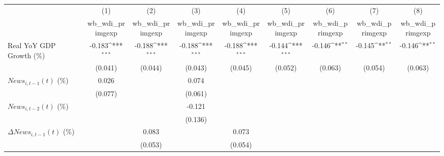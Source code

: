 {
\def\sym#1{\ifmmode^{#1}\else\(^{#1}\)\fi}
\begin{tabular}{l*{8}{c}}
\toprule
                    &\multicolumn{1}{c}{(1)}&\multicolumn{1}{c}{(2)}&\multicolumn{1}{c}{(3)}&\multicolumn{1}{c}{(4)}&\multicolumn{1}{c}{(5)}&\multicolumn{1}{c}{(6)}&\multicolumn{1}{c}{(7)}&\multicolumn{1}{c}{(8)}\\
                    &\multicolumn{1}{c}{wb_wdi_primgexp}&\multicolumn{1}{c}{wb_wdi_primgexp}&\multicolumn{1}{c}{wb_wdi_primgexp}&\multicolumn{1}{c}{wb_wdi_primgexp}&\multicolumn{1}{c}{wb_wdi_primgexp}&\multicolumn{1}{c}{wb_wdi_primgexp}&\multicolumn{1}{c}{wb_wdi_primgexp}&\multicolumn{1}{c}{wb_wdi_primgexp}\\
\midrule
Real YoY GDP Growth (\%)&      -0.183\sym{***}&      -0.188\sym{***}&      -0.188\sym{***}&      -0.188\sym{***}&      -0.144\sym{***}&      -0.146\sym{**} &      -0.145\sym{**} &      -0.146\sym{**} \\
                    &     (0.041)         &     (0.044)         &     (0.043)         &     (0.045)         &     (0.052)         &     (0.063)         &     (0.054)         &     (0.063)         \\
\addlinespace
$ News_{i,t-1}(t)$ (\%)&       0.026         &                     &       0.074         &                     &                     &                     &                     &                     \\
                    &     (0.077)         &                     &     (0.061)         &                     &                     &                     &                     &                     \\
\addlinespace
$ News_{i,t-2}(t)$ (\%)&                     &                     &      -0.121         &                     &                     &                     &                     &                     \\
                    &                     &                     &     (0.136)         &                     &                     &                     &                     &                     \\
\addlinespace
$ \Delta News_{i,t-1}(t)$ (\%)&                     &       0.083         &                     &       0.073         &                     &                     &                     &                     \\
                    &                     &     (0.053)         &                     &     (0.054)         &                     &                     &                     &                     \\

\end{tabular}}
